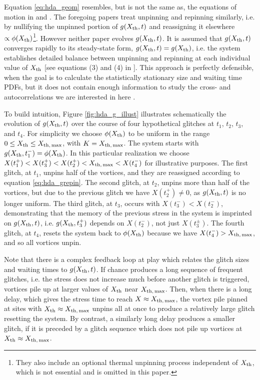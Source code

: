 Equation \eqref{eq:hda_geom} resembles, but is not the same as, the equations of motion in \citet{Sneppen1997} and \citet{Melatos2009}. The foregoing papers treat unpinning and repinning similarly, i.e. by nullifying the unpinned portion of $g(X_{\rm th},t)$ and reassigning it elsewhere $\propto \phi(X_{\rm th})$\footnote{They also include an optional thermal unpinning process independent of $X_{\rm th}$, which is not essential and is omitted in this paper.}. However neither paper evolves $g(X_{\rm th},t)$. It is assumed that $g(X_{\rm th},t)$ converges rapidly to its steady-state form, $g(X_{\rm th},t) = g(X_{\rm th})$, i.e. the system establishes detailed balance between unpinning and repinning at each individual value of $X_{\rm th}$ [see equations (3) and (4) in \citet{Melatos2009}]. This approach is perfectly defensible, when the goal is to calculate the statistically stationary size and waiting time PDFs, but it does not contain enough information to study the cross- and autocorrelations we are interested in here \citep{Melatos2018, Carlin2019quasi, Carlin2019ac}.

To build intuition, Figure \ref{fig:hda_g_illust} illustrates schematically the evolution of $g(X_{\rm th}, t)$ over the course of four hypothetical glitches at $t_1$, $t_2$, $t_3$, and $t_4$. For simplicity we choose $\phi(X_{\rm th})$ to be uniform in the range $0 \leq X_{\rm th} \leq X_{\rm th,\,max}$, with $K = X_{\rm th,\,max}$. The system starts with $g(X_{\rm th}, t_1^-) = \phi(X_{\rm th})$. In this particular realization we choose $X(t_1^+) < X(t_3^+) < X(t_2^+) < X_{\rm th,\,max} < X(t_4^-)$ for illustrative purposes. The first glitch, at $t_1$, unpins half of the vortices, and they are reassigned according to equation \eqref{eq:hda_grepin}. The second glitch, at $t_2$, unpins more than half of the vortices, but due to the previous glitch we have $X(t_2^+) \neq 0$, as $g(X_{\rm th}, t)$ is no longer uniform. The third glitch, at $t_3$, occurs with $X(t_3^-) < X(t_2^-)$, demonstrating that the memory of the previous stress in the system is imprinted on $g(X_{\rm th}, t)$, i.e. $g(X_{\rm th}, t_3^+)$ depends on $X(t_2^-)$, not just $X(t_3^{\pm})$. The fourth glitch, at $t_4$, resets the system back to $\phi(X_{\rm th})$ because we have $X(t_4^-) > X_{\rm th,\,max}$, and so all vortices unpin. 

Note that there is a complex feedback loop at play which relates the glitch sizes and waiting times to $g(X_{\rm th}, t)$. If chance produces a long sequence of frequent glitches, i.e. the stress does not increase much before another glitch is triggered, vortices pile up at larger values of $X_{\rm th}$ near $X_{\rm th,\,max}$. Then, when there is a long delay, which gives the stress time to reach $X \approx X_{\rm th,\,max}$, the vortex pile pinned at sites with $X_{\rm th} \approx X_{\rm th,\,max}$ unpins all at once to produce a relatively large glitch resetting the system. By contrast, a similarly long delay produces a smaller glitch, if it is preceded by a glitch sequence which does not pile up vortices at $X_{\rm th} \approx X_{\rm th,\,max}$.

